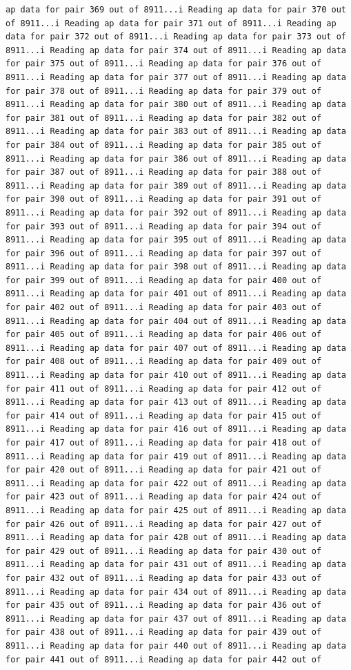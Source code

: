 \documentclass[
]{article}
\begin{document}
\begin{verbatim}
ap data for pair 369 out of 8911...i Reading ap data for pair 370 out of 8911...i Reading ap data for pair 371 out of 8911...i Reading ap data for pair 372 out of 8911...i Reading ap data for pair 373 out of 8911...i Reading ap data for pair 374 out of 8911...i Reading ap data for pair 375 out of 8911...i Reading ap data for pair 376 out of 8911...i Reading ap data for pair 377 out of 8911...i Reading ap data for pair 378 out of 8911...i Reading ap data for pair 379 out of 8911...i Reading ap data for pair 380 out of 8911...i Reading ap data for pair 381 out of 8911...i Reading ap data for pair 382 out of 8911...i Reading ap data for pair 383 out of 8911...i Reading ap data for pair 384 out of 8911...i Reading ap data for pair 385 out of 8911...i Reading ap data for pair 386 out of 8911...i Reading ap data for pair 387 out of 8911...i Reading ap data for pair 388 out of 8911...i Reading ap data for pair 389 out of 8911...i Reading ap data for pair 390 out of 8911...i Reading ap data for pair 391 out of 8911...i Reading ap data for pair 392 out of 8911...i Reading ap data for pair 393 out of 8911...i Reading ap data for pair 394 out of 8911...i Reading ap data for pair 395 out of 8911...i Reading ap data for pair 396 out of 8911...i Reading ap data for pair 397 out of 8911...i Reading ap data for pair 398 out of 8911...i Reading ap data for pair 399 out of 8911...i Reading ap data for pair 400 out of 8911...i Reading ap data for pair 401 out of 8911...i Reading ap data for pair 402 out of 8911...i Reading ap data for pair 403 out of 8911...i Reading ap data for pair 404 out of 8911...i Reading ap data for pair 405 out of 8911...i Reading ap data for pair 406 out of 8911...i Reading ap data for pair 407 out of 8911...i Reading ap data for pair 408 out of 8911...i Reading ap data for pair 409 out of 8911...i Reading ap data for pair 410 out of 8911...i Reading ap data for pair 411 out of 8911...i Reading ap data for pair 412 out of 8911...i Reading ap data for pair 413 out of 8911...i Reading ap data for pair 414 out of 8911...i Reading ap data for pair 415 out of 8911...i Reading ap data for pair 416 out of 8911...i Reading ap data for pair 417 out of 8911...i Reading ap data for pair 418 out of 8911...i Reading ap data for pair 419 out of 8911...i Reading ap data for pair 420 out of 8911...i Reading ap data for pair 421 out of 8911...i Reading ap data for pair 422 out of 8911...i Reading ap data for pair 423 out of 8911...i Reading ap data for pair 424 out of 8911...i Reading ap data for pair 425 out of 8911...i Reading ap data for pair 426 out of 8911...i Reading ap data for pair 427 out of 8911...i Reading ap data for pair 428 out of 8911...i Reading ap data for pair 429 out of 8911...i Reading ap data for pair 430 out of 8911...i Reading ap data for pair 431 out of 8911...i Reading ap data for pair 432 out of 8911...i Reading ap data for pair 433 out of 8911...i Reading ap data for pair 434 out of 8911...i Reading ap data for pair 435 out of 8911...i Reading ap data for pair 436 out of 8911...i Reading ap data for pair 437 out of 8911...i Reading ap data for pair 438 out of 8911...i Reading ap data for pair 439 out of 8911...i Reading ap data for pair 440 out of 8911...i Reading ap data for pair 441 out of 8911...i Reading ap data for pair 442 out of 
\end{verbatim}
\end{document}

